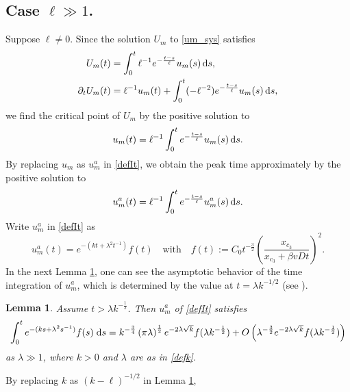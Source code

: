 \documentclass[10pt]{article}
\newtheorem{lemma}[theorem]{Lemma}
\numberwithin{equation}{section}
\numberwithin{figure}{section}
\begin{document}
\subsection{Case $\ell \gg 1$.}
Suppose $\ell \neq 0$. Since the solution $U_m$ to \eqref{um_sys} satisfies 
\begin{equation*}
\begin{split}
U_m(t) &= \int_0^t \ell^{-1}e^{-\frac{t-s}{\ell}} u_m (s)  \,{\rm d}s,  \\
\partial_t U_m(t)&= \ell^{-1} u_m(t) + \int_0^t 
(-\ell^{-2})e^{-\frac{t-s}{\ell}} u_m (s) \,{\rm d}s,
\end{split}
\end{equation*}
we find the critical point of $U_m$ by the positive solution to 
\begin{equation*}
\begin{split}
u_m(t) = \ell^{-1} \int_0^t 
e^{-\frac{t-s}{\ell}} u_m (s) \,{\rm d}s.
\end{split}
\end{equation*}
By replacing $u_m$ as $u^a_m$ in \eqref{defIt}, we obtain the peak time approximately by the positive solution to
\begin{equation}\label{t-deri_Um}
\begin{split}
 u^a_m (t) = \ell^{-1} \int_0^t  e^{-\frac{t-s}{\ell}} u^a_m (s) \,{\rm d}s.
\end{split}
\end{equation}
Write $u_m^a$ in \eqref{defIt} as
$$
 u^a_m(t) = e^{-(kt+\lambda^2 t^{-1})} f(t) \quad \mbox{with} \quad f(t) := C_0
 t^{-\frac{3}{2}}\left(\frac{x_{c_3}}{x_{c_3}+\beta v D t}\right)^2.
$$
In the next Lemma \ref{integralest}, one can see the asymptotic behavior of the time integration of $u_m^a$, which is determined by the value at $t = \lambda k^{-1/2}$ (see \cite[Theorem 2.3 ]{Chen2025}).
\begin{lemma}\label{integralest}
Assume $t>\lambda k^{-\frac{1}{2}}$.
Then $u^a_m$ of \eqref{defIt} satisfies
\begin{equation}
\label{integralbehavior}
\int_0^t  e^{-(ks+\lambda^2 s^{-1})} f(s) \; {\rm d}s = k^{-\frac{3}{4}} \left( \pi \lambda \right)^\frac{1}{2} 
 e^{-2 \lambda \sqrt{k}} f( \lambda k^{-\frac{1}{2}})  + O\left( \lambda^{-\frac{3}{2}} e^{-2 \lambda \sqrt{k} }  f( \lambda k^{-\frac{1}{2}}) \right) 
\end{equation}
as $\lambda \gg 1$, where $k>0$ and $\lambda$ are as in \eqref{defk}.
\end{lemma}
By replacing $k$ as $(k-\ell)^{-1/2}$ in Lemma  \ref{integralest},
\end{document}
